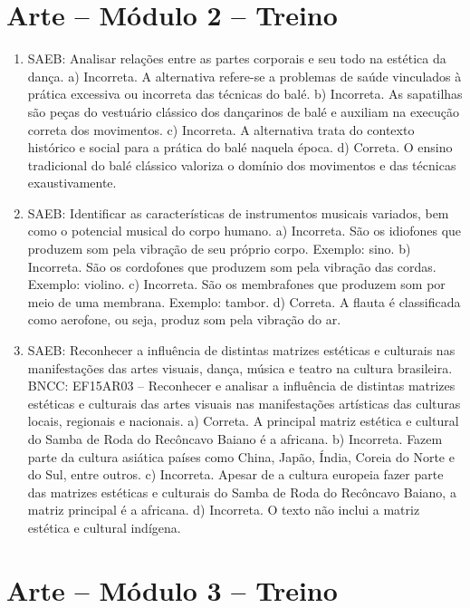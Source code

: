 \section*{Arte – Módulo 2 –  Treino}

\begin{enumerate}
\item
SAEB: Analisar relações entre as partes corporais e seu todo na
estética da dança.
a) Incorreta. A alternativa refere-se a problemas de saúde vinculados
à prática excessiva ou incorreta das técnicas do balé.
b) Incorreta. As sapatilhas são peças do vestuário clássico dos
dançarinos de balé e auxiliam na execução correta dos movimentos.
c) Incorreta. A alternativa trata do contexto histórico e social para a prática do
balé naquela época.
d) Correta. O ensino tradicional do balé clássico valoriza o domínio dos
movimentos e das técnicas exaustivamente.

\item
SAEB: Identificar as características de instrumentos musicais
variados, bem como o potencial musical do corpo humano.
a) Incorreta. São os idiofones que produzem som pela vibração de
seu próprio corpo. Exemplo: sino.
b) Incorreta. São os cordofones que produzem som pela vibração das
cordas. Exemplo: violino.
c) Incorreta. São os membrafones que produzem som por meio de uma
membrana. Exemplo: tambor.
d) Correta. A flauta é classificada como aerofone, ou seja, produz som
pela vibração do ar.

\item
SAEB: Reconhecer a influência de distintas matrizes estéticas e
culturais nas manifestações das artes visuais, dança, música e teatro na
cultura brasileira.
BNCC: EF15AR03 – Reconhecer e analisar a influência de distintas
matrizes estéticas e culturais das artes visuais nas manifestações
artísticas das culturas locais, regionais e nacionais.
a) Correta. A principal matriz estética e cultural do Samba de Roda do
Recôncavo Baiano é a africana.
b) Incorreta. Fazem parte da cultura asiática países como China,
Japão, Índia, Coreia do Norte e do Sul, entre outros.
c) Incorreta. Apesar de a cultura europeia fazer parte das matrizes
estéticas e culturais do Samba de Roda do Recôncavo Baiano, a matriz
principal é a africana.
d) Incorreta. O texto não inclui a matriz estética e cultural indígena.
\end{enumerate}

\section*{Arte – Módulo 3 –  Treino}

